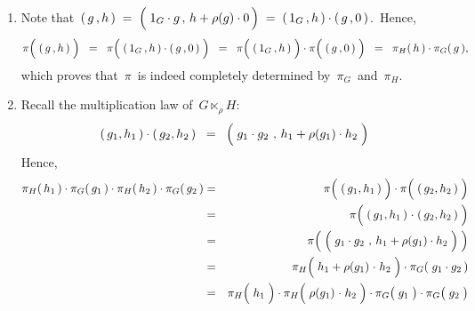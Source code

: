 \begin{enumerate}
\item
	Note that
	\,$(\,g\,,h\,) \;=\; \left(\;1_{G} \cdot g\,,\, h + \rho(g)\cdot \overset{{\color{white}.}}{0}\,\right) \;=\; (\,1_{G}\,,h\,)\cdot (\,g\,,0\,)$.\,
	Hence,
	\begin{equation*}
	\pi\!\left(\;(\,\overset{{\color{white}1}}{g}\,,h\,)\;\right)
	\;\; = \;\;
		\pi\!\left(\;
			(\,1_{G}\,,h\,)
			\cdot
			(\,\overset{{\color{white}1}}{g}\,,0\,)
			\;\right)
	\;\; = \;\;
		\pi\!\left(\;
			(\,1_{G}\,,\overset{{\color{white}.}}{h}\,)
			\;\right)
		\cdot
		\pi\!\left(\;
			(\,\overset{{\color{white}.}}{g}\,,\overset{{\color{white}.}}{0}\,)
			\;\right)
	\;\; = \;\;
		\pi_{H}(\,h\,) \cdot \pi_{G}(\,g\,),
	\end{equation*}
	which proves that \,$\pi$\, is indeed completely determined by
	\,$\pi_{G}$\, and \,$\pi_{H}$.\,
\item
	Recall the multiplication law of \,$G \ltimes_{\rho}\! H$:\,
	\begin{equation*}
	(\,g_{1},h_{1}\,) \cdot (\,g_{2},h_{2}\,)
	\;\; = \;\;
		\left(\;
			\overset{{\color{white}1}}{g_{1}} \cdot g_{2}
			\;\overset{{\color{white}1}}{,}\;
			h_{1} + \rho(g_{1}) \cdot h_{2}
			\;\right)
	\end{equation*}
	Hence,
	\begin{eqnarray*}
	\pi_{H}(\,h_{1}\,) \cdot \pi_{G}(\,g_{1}\,)
	\cdot
	\pi_{H}(\,h_{2}\,) \cdot \pi_{G}(\,g_{2}\,)
	& = &
		\pi\!\left(\;
			(\,\overset{{\color{white}1}}{g_{1}},h_{1}\,)
			\;\right)
		\cdot
		\pi\!\left(\;
			(\,\overset{{\color{white}1}}{g_{2}},h_{2}\,)
			\;\right)
	\\
	& = &
		\pi\!\left(\;
			(\,g_{1},h_{1}\,) \overset{{\color{white}1}}{\cdot} (\,g_{2},h_{2}\,)
			\;\right)
	\\
	& = &
		\pi\!\left(\;
			\left(\;
				\overset{{\color{white}1}}{g_{1}} \cdot g_{2}
				\;\overset{{\color{white}1}}{,}\;
				h_{1} + \rho(g_{1}) \cdot h_{2}
				\;\right)
			\;\right)
	\\
	& = &
		\pi_{H}\!\left(\;h_{1} + \rho(g_{1}) \overset{{\color{white}1}}{\cdot} h_{2}\;\right)
		\cdot
		\pi_{G}(\;g_{1}\cdot g_{2}\,)
	\\
	& = &
		\pi_{H}\!\left(\;\overset{{\color{white}.}}{h_{1}}\;\right)
		\cdot
		\pi_{H}\!\left(\;\rho(g_{1}) \overset{{\color{white}1}}{\cdot} h_{2}\;\right)
		\cdot
		\pi_{G}\!\left(\;\overset{{\color{white}.}}{g_{1}}\;\right)
		\cdot
		\pi_{G}\!\left(\;\overset{{\color{white}.}}{g_{2}}\;\right)
	\end{eqnarray*}

\end{enumerate}
